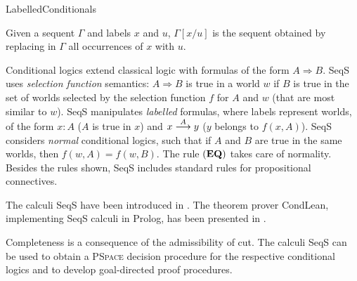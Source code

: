 \begin{entry}{LabelledConditionals}
\begin{calculus}
\begin{footnotesize}
\begin{center}
{\scriptsize Given a sequent $\Gamma$ and labels $x$ and $u$,  $\Gamma[x/u]$ is the sequent obtained by replacing in $\Gamma$ all occurrences of $x$ with $u$.}
\end{center}
\end{footnotesize}
\end{calculus}



 \begin{clarifications}
Conditional logics extend classical logic with formulas of the form $A \Rightarrow B$. SeqS uses \emph{selection function} semantics:  $A \Rightarrow B$ is true in a world $w$ if $B$ is true in the set of worlds selected by the selection function $f$ for $A$ and $w$ (that are most similar to $w$). SeqS manipulates \emph{labelled} formulas, where labels represent worlds, of the form $x: A$ ($A$ is true in $x$) and $x \stackrel{A}{\longrightarrow} y$ ($y$ belongs to $f(x,A)$).
%
SeqS considers \emph{normal} conditional logics, such that if $A$ and $B$ are true in the same worlds, then $f(w,A)=f(w,B)$. The rule $({\bf EQ})$ takes care of normality.
%
  Besides the rules shown, SeqS includes standard 
   rules for propositional connectives.
 \end{clarifications}

 \begin{history}
  The calculi SeqS have been introduced in 
  \cite{toclpozz}. The theorem prover CondLean, implementing SeqS calculi in Prolog, has been presented in \cite{tab2003pozz,tab2005pozz}.
 \end{history}

 \begin{technicalities}
Completeness is a consequence of the admissibility of cut. The calculi SeqS can be used to obtain a \textsc{PSpace} decision procedure for the respective conditional logics and to develop goal-directed proof procedures.
 \end{technicalities}

\vspace{-10pt}











\end{entry}
